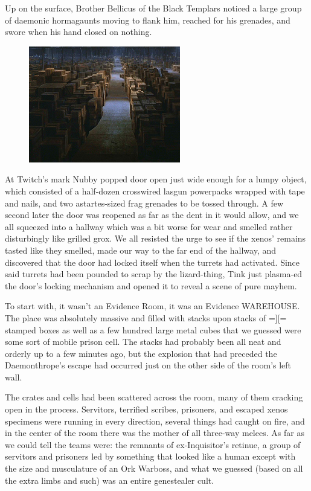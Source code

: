 Up on the surface, Brother Bellicus of the Black Templars noticed a large group of daemonic hormagaunts moving to flank him, reached for his grenades, and swore when his hand closed on nothing.

\begin{figure}
	\begin{center}
		\includegraphics[width=\figwidth]{pics/16/23.png}
	\end{center}
\end{figure}
At Twitch's mark Nubby popped door open just wide enough for a lumpy object, which consisted of a half-dozen crosswired lasgun powerpacks wrapped with tape and nails, and two astartes-sized frag grenades to be tossed through. 
A few second later the door was reopened as far as the dent in it would allow, and we all squeezed into a hallway which was a bit worse for wear and smelled rather disturbingly like grilled grox. 
We all resisted the urge to see if the xenos' remains tasted like they smelled, made our way to the far end of the hallway, and discovered that the door had locked itself when the turrets had activated. 
Since said turrets had been pounded to scrap by the lizard-thing, Tink just plasma-ed the door's locking mechanism and opened it to reveal a scene of pure mayhem.

To start with, it wasn't an Evidence Room, it was an Evidence WAREHOUSE. 
The place was absolutely massive and filled with stacks upon stacks of  =][= stamped boxes as well as a few hundred large metal cubes that we guessed were some sort of mobile prison cell. 
The stacks had probably been all neat and orderly up to a few minutes ago, but the explosion that had preceded the Daemonthrope's escape had occurred just on the other side of the room's left wall. 


The crates and cells had been scattered across the room, many of them cracking open in the process. 
Servitors, terrified scribes, prisoners, and escaped xenos specimens were running in every direction, several things had caught on fire, and in the center of the room there was the mother of all three-way melees. 
As far as we could tell the teams were: 
the remnants of ex-Inquisitor's retinue, a group of servitors and prisoners led by something that looked like a human except with the size and musculature of an Ork Warboss, and what we guessed (based on all the extra limbs and such) was an entire genestealer cult.

